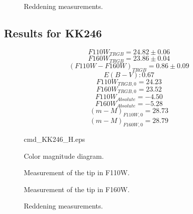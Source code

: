 \documentclass[12,manuscript,usenatbib]{aastex}
\begin{document}
\begin{figure}
\caption{Reddening measurements.\label{reddening1}}
\end{figure}

\subsection{Results for KK246}

\begin{equation}
F110W_{TRGB}=24.82 \pm 0.06
\end{equation}
\begin{equation}
F160W_{TRGB}=23.86 \pm 0.04
\end{equation}
\begin{equation}
(F110W-F160W)_{TRGB}=0.86 \pm 0.09
\end{equation}
\begin{equation}
E(B-V): 0.67
\end{equation}
\begin{equation}
F110W_{TRGB,0} = 24.23
\end{equation}
\begin{equation}
F160W_{TRGB,0} = 23.52
\end{equation}
\begin{equation}
F110W_{Absolute} = -4.50
\end{equation}
\begin{equation}
F160W_{Absolute} = -5.28
\end{equation}
\begin{equation}
(m-M)_{F110W,0}=28.73
\end{equation}
\begin{equation}
(m-M)_{F160W,0}=28.79
\end{equation}

\begin{figure}
 {cmd_KK246_H.eps}
\caption{Color magnitude diagram.\label{cmd2}}
\end{figure}

\begin{figure}
\caption{Measurement of the tip in F110W.\label{lf2_1}}
\end{figure}

\begin{figure}
\caption{Measurement of the tip in F160W.\label{lf2_2}}
\end{figure}


\begin{figure}
\caption{Reddening measurements.\label{reddening2}}
\end{figure}





\end{document}
